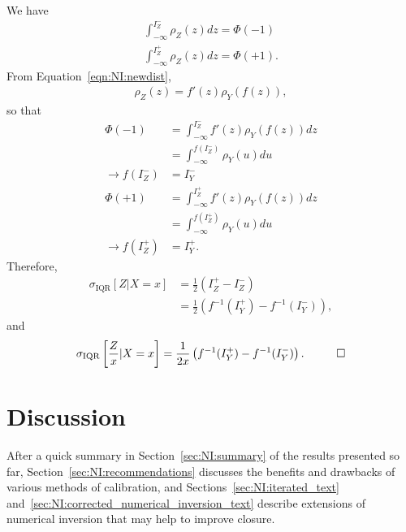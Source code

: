 We have
\begin{align}
\int_{-\infty}^{I_Z^-}\rho_Z(z)dz = \Phi(-1)\\
\int_{-\infty}^{I_Z^+}\rho_Z(z)dz = \Phi(+1).
\end{align}
From Equation~\ref{eqn:NI:newdist},
\begin{align}
\rho_Z(z) = f'(z)\rho_Y(f(z)),
\end{align}
so that
\begin{align}
\Phi(-1) &= \int_{-\infty}^{I_Z^-}f'(z)\rho_Y(f(z))dz\nonumber\\
&=\int_{-\infty}^{f(I_Z^-)}\rho_Y(u)du\nonumber\\
\rightarrow f(I_Z^-) &= I_Y^-\\
\Phi(+1) &= \int_{-\infty}^{I_Z^+}f'(z)\rho_Y(f(z))dz\nonumber\\
&=\int_{-\infty}^{f(I_Z^+)}\rho_Y(u)du\nonumber\\
\rightarrow f(I_Z^+) &= I_Y^+.
\end{align}
Therefore,
\begin{align}
\sigma_\text{IQR}[Z|X=x] &= \frac{1}{2}\left(I_Z^+-I_Z^-\right)\nonumber\\
&=\frac{1}{2}\left(f^{-1}(I_Y^+)-f^{-1}(I_Y^-)\right),
\end{align}
and
\begin{align}
\sigma_\text{IQR}\left[\frac{Z}{x}|X=x\right]=\frac{1}{2x}\left(f^{-1}(I_Y^+)-f^{-1}(I_Y^-)\right).\hspace{1 cm}\Box
\label{eqn:NI:resolutionmedian_text}
\end{align}
\newpage
\section{Discussion}
\label{sec:NI:discussion}

After a quick summary in Section~\ref{sec:NI:summary} of the results presented so far, Section~\ref{sec:NI:recommendations} discusses the benefits and drawbacks of various methods of calibration, and Sections~\ref{sec:NI:iterated_text} and~\ref{sec:NI:corrected_numerical_inversion_text} describe extensions of numerical inversion that may help to improve closure.

